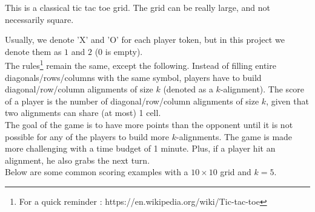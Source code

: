 \documentclass[12pt,a4paper,BCOR12mm, headexclude, footexclude, twoside, openright]{scrartcl}
\numberwithin{equation}{section} %
\numberwithin{figure}{section} %
\numberwithin{table}{section} %
\begin{document}
\begin{center}
\end{center}

This is a classical tic tac toe grid. The grid can be really large, and not necessarily square.

Usually, we denote 'X' and 'O' for each player token, but in this project we denote them as $1$ and $2$ ($0$ is empty).\\

The rules\footnote{For a quick reminder : https://en.wikipedia.org/wiki/Tic-tac-toe} remain the same, except the following. Instead of filling entire diagonals/rows/columns with the same symbol, players have to build diagonal/row/column alignments of size $k$ (denoted as a $k$-alignment). The score of a player is the number of diagonal/row/column alignments of size $k$, given that two alignments can share (at most) 1 cell.\\

The goal of the game is to have more points than the opponent until it is not possible for any of the players to build more $k$-alignments. The game is made more challenging with a time budget of 1 minute. Plus, if a player hit an alignment, he also grabs the next turn.\\

Below are some common scoring examples with a $10 \times 10$ grid and $k = 5$.
\end{document}
